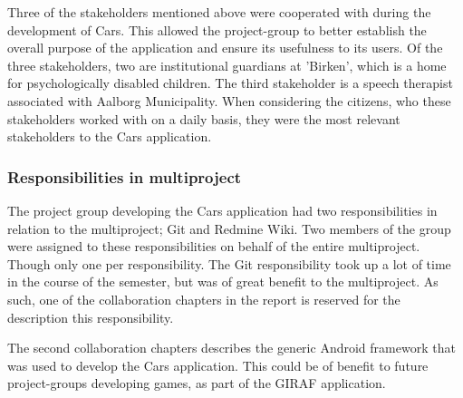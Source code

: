 \documentclass[a4paper,12pt,english]{article}
\begin{document}
Three of the stakeholders mentioned above were cooperated with during the development of Cars.
This allowed the project-group to better establish the overall purpose of the application and ensure its usefulness to its users.
Of the three stakeholders, two are institutional guardians at 'Birken', which is a home for psychologically disabled children.
The third stakeholder is a speech therapist associated with Aalborg Municipality.
When considering the citizens, who these stakeholders worked with on a daily basis, they were the most relevant stakeholders to the Cars application.

\subsubsection*{Responsibilities in multiproject}
The project group developing the Cars application had two responsibilities in relation to the multiproject; Git and Redmine Wiki.
Two members of the group were assigned to these responsibilities on behalf of the entire multiproject.
Though only one per responsibility.
The Git responsibility took up a lot of time in the course of the semester, but was of great benefit to the multiproject.
As such, one of the collaboration chapters in the report is reserved for the description this responsibility.

The second collaboration chapters describes the generic Android framework that was used to develop the Cars application.
This could be of benefit to future project-groups developing games, as part of the GIRAF application.
\end{document}
